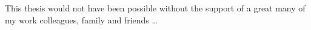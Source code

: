 

\begin{spacing}{1.0}
    This thesis would not have been possible without the support of a great many of my work 
    colleagues, family and friends \dots
\end{spacing}
